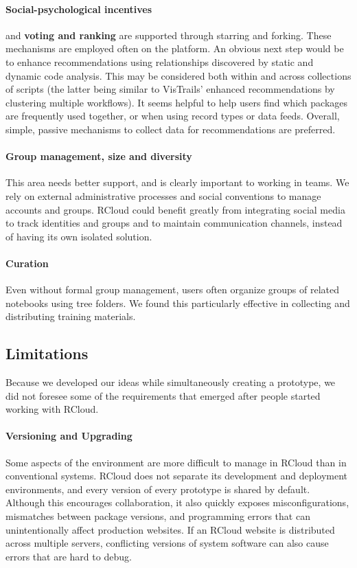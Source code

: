 \paragraph*{Social-psychological incentives} and {\bf voting and ranking} are
supported through starring and forking. These mechanisms are employed often
on the platform. An obvious next step would be to enhance recommendations
using relationships discovered by static and dynamic code analysis. This
may be considered both within and across collections of scripts (the latter
being similar to VisTrails' enhanced recommendations by clustering multiple
workflows). It seems helpful to help users find which packages are frequently
used together, or when using record types or data feeds.
Overall, simple, passive mechanisms to collect data for recommendations are preferred.

\paragraph*{Group management, size and diversity} This area needs better
support, and is clearly important to working in teams.
We rely on external administrative processes and social conventions
to manage accounts and groups. RCloud could benefit greatly from
integrating social media to track identities and groups and to maintain
communication channels, instead of having its own isolated solution.

\paragraph*{Curation} Even without formal group management, users often
organize groups of related notebooks using tree folders.
We found this particularly effective in collecting and distributing
training materials.

\subsection{Limitations}
Because we developed our ideas while simultaneously creating a prototype,
we did not foresee some of the requirements that emerged after
people started working with RCloud.

\paragraph*{Versioning and Upgrading}
Some aspects of the environment are more difficult to
manage in RCloud than in conventional systems. RCloud does not separate
its development and deployment environments, and every version of every
prototype is shared by default. Although this encourages
collaboration, it also quickly exposes misconfigurations,
mismatches between package versions, and programming errors
that can unintentionally affect production websites.
If an RCloud website is distributed across multiple servers,
conflicting versions of system software
can also cause errors that are hard to debug.

